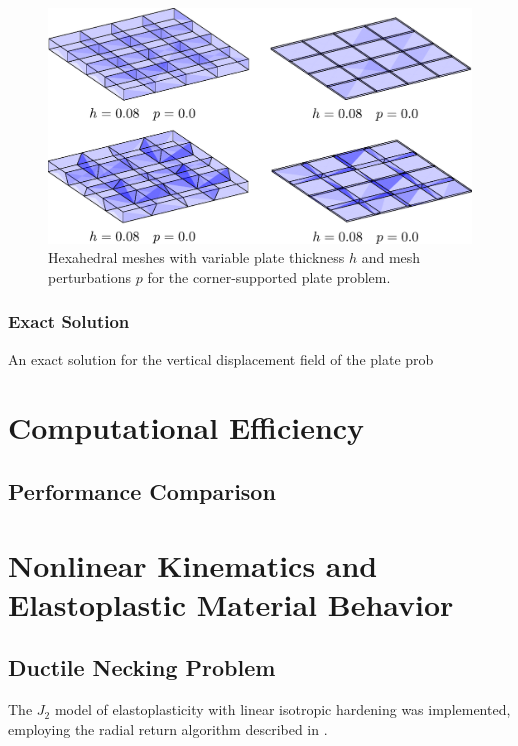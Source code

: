 \begin{figure}[!h]
  \centering
  \includegraphics[width=6.0in]{figures/plate_meshes.pdf}
  \caption{Hexahedral meshes with variable plate thickness $h$ and mesh perturbations $p$ for the corner-supported plate problem.}
  \label{fig:plate_meshes}
\end{figure}

\subsubsection{Exact Solution}

An exact solution for the vertical displacement field of the plate prob

\section{Computational Efficiency}

\subsection{Performance Comparison}



\section{Nonlinear Kinematics and Elastoplastic Material Behavior}

\subsection*{Ductile Necking Problem}

The $J_2$ model of elastoplasticity with linear isotropic hardening was implemented, employing the radial return algorithm described in \cite{LSDYNA}.

